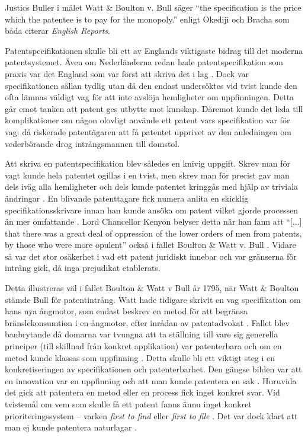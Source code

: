 
Justics Buller i målet Watt \& Boulton v. Bull säger
``the specification is the price which 
the patentee is to pay for the monopoly.'' enligt Okediji \cite{oked} och Bracha\cite{bracha} som båda citerar \emph{English Reports}.

Patentspecifikationen skulle bli ett av Englands viktigaste bidrag till det
moderna patentsystemet. Även om
Nederländerna redan hade patentspecifikation som praxis var det England som var först att skriva det i
lag \cite{macleod}. Dock var specifikationen sällan tydlig utan då den endast undersöktes vid tvist
kunde den ofta lämnas väldigt vag för att inte avslöja hemligheter om uppfinningen. Detta går emot tanken
att patent ges utbytte mot kunskap. Däremot kunde det leda till komplikationer om någon olovligt använde ett
patent vars specifikation var för vag; då riskerade patentägaren att få patentet upprivet av den anledningen om vederbörande drog intrångsmannen till domstol.

Att skriva en patentspecifikation blev således en knivig uppgift. Skrev man för vagt kunde hela patentet
ogillas i en tvist, men skrev man för precist gav man dels iväg alla hemligheter och dels kunde patentet
kringgås med hjälp av triviala ändringar \cite{macleod}. En
blivande patenttagare fick numera anlita en skicklig specifikationsskrivare innan han kunde ansöka om
patent vilket gjorde processen än mer omfattande \cite{macleod}. Lord Chancellor Kenyon belyser detta när han fann att ``[...] that there was a great deal of 
oppression of the lower orders of men from patents, by those who were more 
opulent'' också i fallet Boulton \& Watt v. Bull \cite{macleod, robinson}.
Vidare så var det stor osäkerhet i vad ett patent juridiskt innebar och var gränserna för intrång gick, då inga prejudikat etablerats.

Detta illustreras väl i fallet Boulton \& Watt v Bull år 1795, när Watt \& Boulton stämde Bull för patentintrång. Watt hade tidigare skrivit en vag specifikation om hans nya ångmotor, som endast beskrev en metod för att begränsa bränslekonsumtion i en ångmotor, efter inrådan av patentadvokat \cite{bracha}. Fallet blev banbrytande då domarna var tvungna att ta ställning till vare sig generella principer (till skillnad från konkret applikation) var patenterbara och om en metod kunde klassas som uppfinning \cite{bracha}. Detta skulle bli ett viktigt steg i en konkretiseringen av specifikationen och patenterbarhet. Den gängse bilden var att en innovation var en uppfinning och att man kunde patentera en sak \cite{bracha}. Huruvida det gick att patentera en metod eller en process fick inget konkret svar. Vid tvistemål om vem som skulle få ett patent fanns ännu inget konkret prioriteringssystem -- varken \emph{first to find} eller \emph{first to file} \cite{bracha}. Det var dock klart att man ej kunde patentera naturlagar \cite{bracha}.


